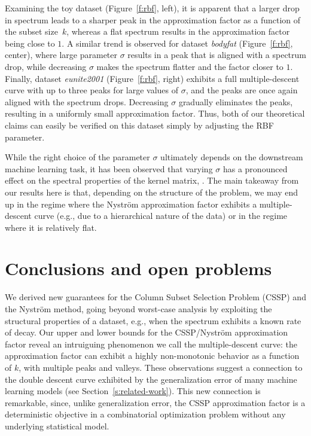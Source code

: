 \documentclass{article}
\begin{document}
Examining the toy dataset (Figure~\ref{f:rbf}, left), it is apparent
that a larger drop in spectrum leads to a sharper peak in the
approximation factor as a function of the subset size~$k$, whereas a flat spectrum results in  
the approximation factor being close to $1$. A similar trend is observed for
dataset \emph{bodyfat} (Figure~\ref{f:rbf}, center), where large
parameter $\sigma$ results in a peak that is aligned with a spectrum
drop, while 
decreasing $\sigma$ makes the spectrum flatter and the factor closer to
$1$. Finally, dataset \emph{eunite2001} (Figure~\ref{f:rbf}, right) exhibits a full
multiple-descent curve with up to three peaks for large values of
$\sigma$, and the peaks are once again aligned with the spectrum
drops. Decreasing $\sigma$ gradually eliminates the peaks, 
resulting in a uniformly small approximation factor. Thus, both of our theoretical
claims can easily be verified on this dataset simply by adjusting the RBF parameter.

While the right choice of the parameter $\sigma$ ultimately depends on
the downstream machine learning task, it has been observed that
varying $\sigma$ has a pronounced effect on the spectral properties of
the kernel matrix, \citep[see,
e.g.,][]{revisiting-nystrom,LBM16_TR,wang2019block}.  
The main takeaway from our results here is that, depending on the
structure of the problem, we may end up in the regime where the
Nystr\"om approximation factor exhibits a multiple-descent curve
(e.g., due to a hierarchical nature of the data) or in the regime
where it is relatively flat.  


\section{Conclusions and open problems}
\label{s:conclusions}
We derived new guarantees for the Column Subset Selection Problem (CSSP) and
the Nystr\"om method, going beyond worst-case analysis by exploiting the
structural properties of a dataset, e.g., when the spectrum exhibits a
known rate of decay. Our upper and lower bounds
for the CSSP/Nystr\"om approximation factor reveal an intruiguing phenomenon we
call the multiple-descent curve: the approximation factor can exhibit a highly
non-monotonic behavior as a function of $k$, with multiple
peaks and valleys. These observations suggest a connection to the
double descent curve exhibited by
the generalization error of many machine learning models (see
Section~\ref{s:related-work}). This new 
connection is remarkable, since, unlike generalization error, the CSSP
approximation factor is a deterministic objective in a combinatorial
optimization problem without any underlying statistical model. 
\end{document}
